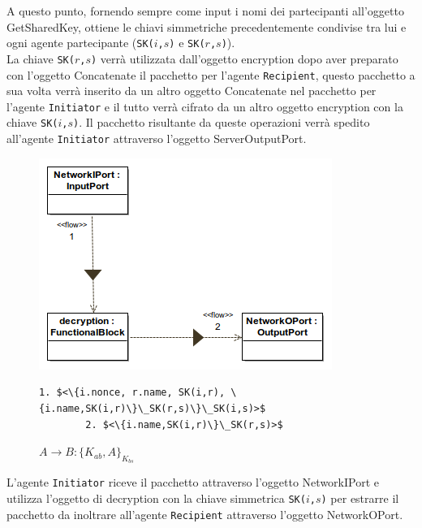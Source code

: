 A questo punto, fornendo sempre come input i nomi dei partecipanti all'oggetto GetSharedKey, ottiene le chiavi simmetriche precedentemente condivise tra lui e ogni agente partecipante (\texttt{SK($i$,$s$)} e \texttt{SK($r$,$s$)}).\\ 
La chiave \texttt{SK($r$,$s$)} verrà utilizzata dall'oggetto encryption dopo aver preparato con l'oggetto Concatenate il pacchetto per l'agente \texttt{Recipient}, questo pacchetto a sua volta verrà inserito da un altro oggetto Concatenate nel pacchetto per l'agente \texttt{Initiator} e il tutto verrà cifrato da un altro oggetto encryption con la chiave \texttt{SK($i$,$s$)}. Il pacchetto risultante da queste operazioni verrà spedito all'agente \texttt{Initiator} attraverso l'oggetto ServerOutputPort.\\

\begin{figure}[h!] 
    \centering 
    \includegraphics[scale=0.6]{../img/NSSK/FirstMessage.png} 
    \begin{lstlisting}[frame=single, mathescape, basicstyle=\footnotesize]
        1. $<\{i.nonce, r.name, SK(i,r), \{i.name,SK(i,r)\}\_SK(r,s)\}\_SK(i,s)>$
        2. $<\{i.name,SK(i,r)\}\_SK(r,s)>$
    \end{lstlisting}
    \caption{$A \rightarrow B : \{K_{ab}, A\}_{K_{bs}}$} 
\end{figure}
\noindent L'agente \texttt{Initiator} riceve il pacchetto attraverso l'oggetto NetworkIPort e utilizza l'oggetto di decryption con la chiave simmetrica \texttt{SK($i$,$s$)} per estrarre il pacchetto da inoltrare all'agente \texttt{Recipient} attraverso l'oggetto NetworkOPort.\\
